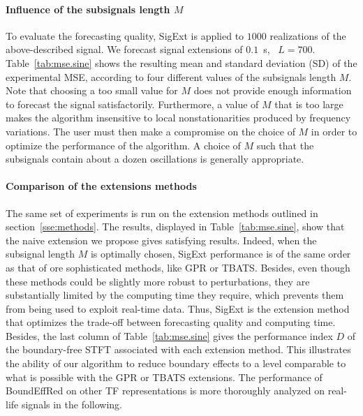 {\color{red}
\paragraph{Influence of the subsignals length $M$}
To evaluate the forecasting quality, {\sf SigExt} is applied to $1000$ realizations of the above-described signal. We forecast signal extensions of $0.1$~s, \ie~$L=700$. Table~\ref{tab:mse.sine} shows the resulting mean and standard deviation (SD) of the experimental MSE, according to four different values of the subsignals length $M$. Note that choosing a too small value for $M$ does not provide enough information to forecast the signal satisfactorily. Furthermore, a value of $M$ that is too large makes the algorithm insensitive to local nonstationarities produced by frequency variations. The user must then make a compromise on the choice of $M$ in order to optimize the performance of the algorithm. A choice of $M$ such that the subsignals contain about a dozen oscillations is generally appropriate.

\paragraph{Comparison of the extensions methods}
The same set of experiments is run on the extension methods outlined in section~\ref{sse:methods}. The results, displayed in Table~\ref{tab:mse.sine}, show that the naive extension we propose gives satisfying results. Indeed, when the subsignal length $M$ is optimally chosen, {\sf SigExt} performance is of the same order as that of ore sophisticated methods, like GPR or TBATS. Besides, even though these methods could be slightly more robust to perturbations, they are substantially limited by the computing time they require, which prevents them from being used to exploit real-time data. Thus, {\sf SigExt} is the extension method that optimizes the trade-off between forecasting quality and computing time.
Besides, the last column of Table~\ref{tab:mse.sine} gives the performance index $D$ of the boundary-free STFT associated with each extension method. This illustrates the ability of our algorithm to reduce boundary effects to a level comparable to what is possible with the GPR or TBATS extensions. The performance of {\sf BoundEffRed} on other TF representations is more thoroughly analyzed on real-life signals in the following.
}

